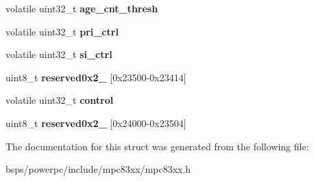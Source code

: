 \begin{DoxyCompactItemize}
\mbox{\label{structm83xxUSB__DRRegisters___afde5f315f744522b251b49dfb534b495}} 
volatile uint32\+\_\+t {\bfseries age\+\_\+cnt\+\_\+thresh}
\item 
\mbox{\label{structm83xxUSB__DRRegisters___a0f576e53efa03d5f745c1da4de0eb0f9}} 
volatile uint32\+\_\+t {\bfseries pri\+\_\+ctrl}
\item 
\mbox{\label{structm83xxUSB__DRRegisters___ab53663c8a716b49a946b0cf2d825018f}} 
volatile uint32\+\_\+t {\bfseries si\+\_\+ctrl}
\item 
\mbox{\label{structm83xxUSB__DRRegisters___a59afc511709cb2c383469d5543939142}} 
uint8\+\_\+t {\bfseries reserved0x2\+\_} \mbox{[}0x23500-\/0x23414\mbox{]}
\item 
\mbox{\label{structm83xxUSB__DRRegisters___ac431d2887fe61d8b21c7a4b6a7512367}} 
volatile uint32\+\_\+t {\bfseries control}
\item 
\mbox{\label{structm83xxUSB__DRRegisters___af7c8a5a6860aa77adfc856d0a966f078}} 
uint8\+\_\+t {\bfseries reserved0x2\+\_} \mbox{[}0x24000-\/0x23504\mbox{]}
\end{DoxyCompactItemize}


The documentation for this struct was generated from the following file\+:\begin{DoxyCompactItemize}
\item 
bsps/powerpc/include/mpc83xx/mpc83xx.\+h\end{DoxyCompactItemize}
